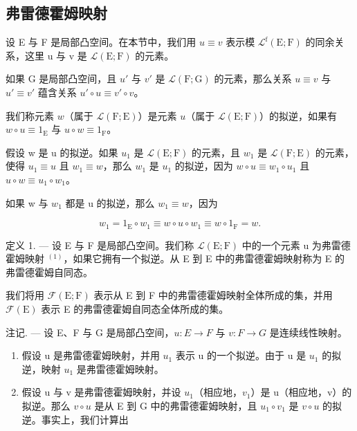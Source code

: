 \subsection{弗雷德霍姆映射}

设 E 与 F 是局部凸空间。在本节中，我们用 \(u \equiv v\) 表示模 \(\mathcal{L}^{\mathrm{f}}(\mathrm{E};\mathrm{F})\) 的同余关系，这里 u 与 v 是 \(\mathcal{L}(\mathrm{E};\mathrm{F})\) 的元素。

如果 G 是局部凸空间，且 \(u'\) 与 \(v'\) 是 \(\mathcal{L}(\mathrm{F};\mathrm{G})\) 的元素，那么关系 \(u \equiv v\) 与 \(u' \equiv v'\) 蕴含关系 \(u' \circ u \equiv v' \circ v\)。

我们称元素 \(w\)（属于 \(\mathcal{L}(\mathrm{F};\mathrm{E})\)）是元素 \(u\)（属于 \(\mathcal{L}(\mathrm{E};\mathrm{F})\)）的拟逆，如果有 \(w \circ u \equiv 1_{\mathrm{E}}\) 与 \(u \circ w \equiv 1_{\mathrm{F}}\)。

假设 w 是 u 的拟逆。如果 \(u_{1}\) 是 \(\mathcal{L}(\mathrm{E};\mathrm{F})\) 的元素，且 \(w_{1}\) 是 \(\mathcal{L}(\mathrm{F};\mathrm{E})\) 的元素，使得 \(u_{1} \equiv u\) 且 \(w_{1} \equiv w\)，那么 \(w_{1}\) 是 \(u_{1}\) 的拟逆，因为 \(w \circ u \equiv w_{1} \circ u_{1}\) 且 \(u \circ w \equiv u_{1} \circ w_{1}\)。

如果 w 与 \(w_{1}\) 都是 u 的拟逆，那么 \(w_{1} \equiv w\)，因为

\[
w _ {1} = 1 _ {\mathrm{E}} \circ w _ {1} \equiv w \circ u \circ w _ {1} \equiv w \circ 1 _ {\mathrm{F}} = w.
\]

定义 1. --- 设 E 与 F 是局部凸空间。我们称 \(\mathcal{L}(\mathrm{E};\mathrm{F})\) 中的一个元素 u 为弗雷德霍姆映射 \(^{(1)}\)，如果它拥有一个拟逆。从 E 到 E 中的弗雷德霍姆映射称为 E 的弗雷德霍姆自同态。

我们将用 \(\mathcal{F}(\mathrm{E};\mathrm{F})\) 表示从 E 到 F 中的弗雷德霍姆映射全体所成的集，并用 \(\mathcal{F}(\mathrm{E})\) 表示 E 的弗雷德霍姆自同态全体所成的集。

注记. --- 设 E、F 与 G 是局部凸空间，\(u: E \to F\) 与 \(v: F \to G\) 是连续线性映射。

\begin{enumerate}
\def\labelenumi{\arabic{enumi})}
\item
  假设 u 是弗雷德霍姆映射，并用 \(u_{1}\) 表示 u 的一个拟逆。由于 u 是 \(u_{1}\) 的拟逆，映射 \(u_{1}\) 是弗雷德霍姆映射。
\item
  假设 u 与 v 是弗雷德霍姆映射，并设 \(u_{1}\)（相应地，\(v_{1}\)）是 u（相应地，v）的拟逆。那么 \(v \circ u\) 是从 E 到 G 中的弗雷德霍姆映射，且 \(u_{1} \circ v_{1}\) 是 \(v \circ u\) 的拟逆。事实上，我们计算出
\end{enumerate}

